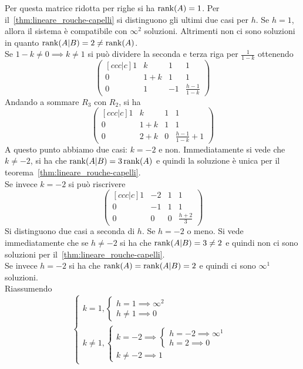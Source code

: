 Per questa matrice ridotta per righe si ha $\rank(A)=1$. Per
il~\autoref{thm:lineare_rouche-capelli} si distinguono gli ultimi due casi per $h$. Se
$h=1$, allora il sistema è compatibile con $\infty^2$ soluzioni. Altrimenti non ci sono
soluzioni in quanto $\rank(A\vert B) = 2 \neq \rank(A)$.\\
Se $1-k\neq0\implies k\neq1$ si può dividere la seconda e terza riga per $\frac{1}{1-k}$
ottenendo
\begin{equation*}
  \begin{pmatrix}[ccc|c]
    1 & k & 1 & 1\\
    0 & 1+k & 1 & 1\\
    0 & 1 & -1 & \frac{h-1}{1-k}
  \end{pmatrix}
\end{equation*}
Andando a sommare $R_3$ con $R_2$, si ha
\begin{equation*}
  \begin{pmatrix}[ccc|c]
    1 & k & 1 & 1\\
    0 & 1+k & 1 & 1\\
    0 & 2+k & 0 & \frac{h-1}{1-k}+1
  \end{pmatrix}
\end{equation*}
A questo punto abbiamo due casi: $k=-2$ e non. Immediatamente si vede che $k\neq-2$, si
ha che $\rank(A\vert B) = 3 \rank(A)$ e quindi la soluzione è unica per il
teorema~\autoref{thm:lineare_rouche-capelli}.\\
Se invece $k=-2$ si può riscrivere
\begin{equation*}
  \begin{pmatrix}[ccc|c]
    1 & -2 & 1 & 1\\
    0 & -1 & 1 & 1\\
    0 & 0 & 0 & \frac{h+2}{3}
  \end{pmatrix}
\end{equation*}
Si distinguono due casi a seconda di $h$. Se $h=-2$ o meno. Si vede immediatamente che
se $h\neq-2$ si ha che $\rank(A\vert B)=3\neq2$ e quindi non ci sono soluzioni per
il~\autoref{thm:lineare_rouche-capelli}.\\
Se invece $h=-2$ si ha che $\rank(A) = \rank(A\vert B) = 2$ e quindi ci sono $\infty^1$
soluzioni.\\
Riassumendo
\begin{equation*}
  \begin{cases}
    k=1,
    \begin{cases}
      h=1\implies\infty^2\\
      h\neq 1\implies 0
    \end{cases}\\
    k\neq1,
    \begin{cases}
      k=-2\implies
      \begin{cases}
        h=-2\implies\infty^1\\
        h=2\implies 0
      \end{cases}\\
      k\neq-2\implies 1
    \end{cases}
  \end{cases}
\end{equation*}

